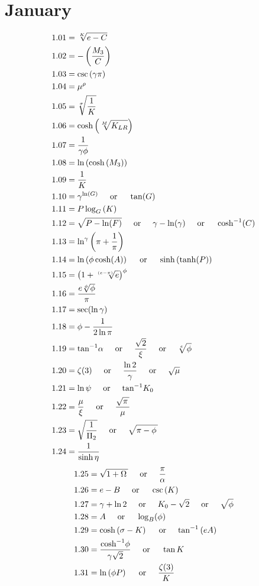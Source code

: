 \documentclass[12pt]{article}
\newcommand{\atan}{\text{tan}^{-1}}
\newcommand{\acosh}{\text{cosh}^{-1}}
\newcommand{\oder}{\hspace{5mm}\text{or}\hspace{5mm}}
\begin{document}
\section{January}
\begin{align*}
1.01 &= \sqrt[K]{e-C}\\
1.02 &= -\left(\frac{M_{3}}{C}\right)\\
1.03 &= \csc{(\gamma \pi)}\\
1.04 &= \mu^{\rho}\\
1.05 &= \sqrt[\sigma]{\frac{1}{K}}\\
1.06 &= \cosh\left(\sqrt[M]{K_{LR}}\right)\\
1.07 &= \frac{1}{\gamma \phi}\\
1.08 &= \ln\left(\cosh\left(M_{3}\right)\right)\\
1.09 &= \frac{1}{K}\\
1.10 &= \gamma^{\ln\left(G\right)} \oder \tan(G)\\
1.11 &= P\log_{G}\left(K\right)\\
1.12 &= \sqrt{P - \ln(F)} \oder \gamma - \ln(\gamma) \oder \cosh^{-1}(C)\\
1.13 &= \ln^{\gamma}\left(\pi + \frac{1}{\pi}\right)\\
1.14 &= \ln\left(\phi \cosh(A)\right) \oder \sinh\left(\tanh(P)\right)\\
1.15 &= \left(1 + \sqrt[\left(e-\pi\right)]{e}\right)^{\phi}\\
1.16 &= \frac{e \sqrt[\phi]{\phi}}{\pi}\\
1.17 &= \sec(\ln \gamma)\\
1.18 &= \phi - \frac{1}{2\ln\pi}\\
1.19 &= \atan{\alpha} \oder \frac{\sqrt{2}}{\xi} \oder \sqrt[e]{\phi}\\
1.20 &= \zeta(3) \oder \frac{\ln{2}}{\gamma} \oder \sqrt{\mu}\\
1.21 &= \ln{\psi} \oder \atan{K_{0}}\\
1.22 &= \frac{\mu}{\xi} \oder \frac{\sqrt{\pi\,}}{\mu}\\
1.23 &= \sqrt{\frac{1}{\Pi_{2}}} \oder \sqrt{\pi-\phi\,}\\
1.24 &= \frac{1}{\sinh{\eta}}\\
\end{align*}
\begin{align*}
1.25 &= \sqrt{1+\Omega\,} \oder \frac{\pi}{\alpha}\\
1.26 &= e-B \oder \csc\left(K\right)\\
1.27 &= \gamma + \ln{2} \oder K_{0}-\sqrt{2} \oder \sqrt{\phi}\\
1.28 &= A \oder \log_{B}(\phi)\\
1.29 &= \cosh\left(\sigma-K\right) \oder \atan\left(e A\right)\\
1.30 &= \frac{\acosh \phi}{\gamma \sqrt{2}} \oder \tan{K}\\
1.31 &= \ln\left(\phi P\right) \oder \frac{\zeta(3)}{K}\\
\end{align*}
\end{document}
